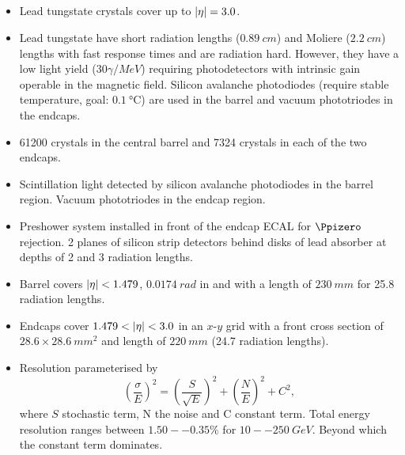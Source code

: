 \subsection{\ECAL}

\begin{itemize}
    \item Lead tungstate crystals cover up to ${|\eta|=3.0}$.
    \item Lead tungstate have short radiation lengths (${\SI{0.89}{cm}}$) and
        Moliere (${\SI{2.2}{cm}}$) lengths with fast response times and are
        radiation hard. However, they have a low light yield
        (${{30}{\gamma/MeV}}$) requiring photodetectors with intrinsic gain
        operable in the magnetic field. Silicon avalanche photodiodes (require
        stable temperature, goal: ${\SI{0.1}{\celsius}}$) are used in the
        barrel and vacuum phototriodes in the endcaps.
    \item 61200 crystals in the central barrel and 7324 crystals in each of the
        two endcaps.
    \item Scintillation light detected by silicon avalanche photodiodes in the
        barrel region. Vacuum phototriodes in the endcap region.
    \item Preshower system installed in front of the endcap ECAL for
        ${\Ppizero}$ rejection. 2 planes of silicon strip detectors behind
        disks of lead absorber at depths of 2 and 3 radiation lengths.
    \item Barrel covers ${|\eta|<1.479}$, ${\SI{0.0174}{rad}}$ in \dphi and
        \deta with a length of ${\SI{230}{mm}}$ for 25.8 radiation lengths.
    \item Endcaps cover ${1.479<\aeta<3.0}$ in an $x$-$y$ grid with a front
        cross section of ${28.6\times\SI{28.6}{mm^2}}$ and length of
        ${\SI{220}{mm}}$ (24.7 radiation lengths).
    \item Resolution parameterised by
        \begin{equation}
            \left( \frac{\sigma}{E} \right)^{2} = \left( \frac{S}{\sqrt{E}} \right)^{2}
            + \left( \frac{N}{E} \right)^{2} + C^2,
        \end{equation}
        where $S$ stochastic term, N the noise and C constant term. Total energy
        resolution ranges between ${1.50--0.35\%}$ for ${10--\SI{250}{GeV}}$.
        Beyond which the constant term dominates.
\end{itemize}

\subsection{\HCAL}

